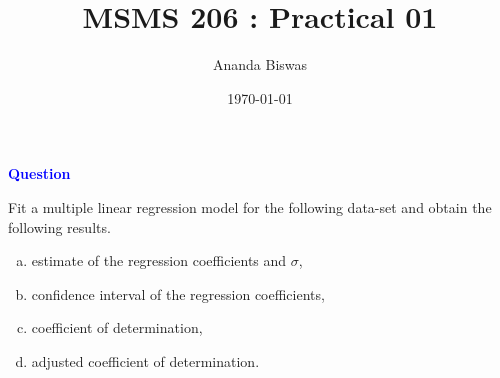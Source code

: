 \documentclass[11pt, a4paper]{article}\usepackage[]{graphicx}\usepackage[]{xcolor}
\title{MSMS 206 : Practical 01}
\author{Ananda Biswas}
\date{\today}
\begin{document}
\maketitle


 \hspace{0.2cm} \textcolor{blue}{\textbf{Question}}

\vspace{0.3cm}

Fit a multiple linear regression model for the following data-set and obtain the following results.

\begin{enumerate}[(a)]

\item estimate of the regression coefficients and $\sigma$,
\item confidence interval of the regression coefficients,
\item coefficient of determination,
\item adjusted coefficient of determination.
\end{enumerate}
\end{document}
